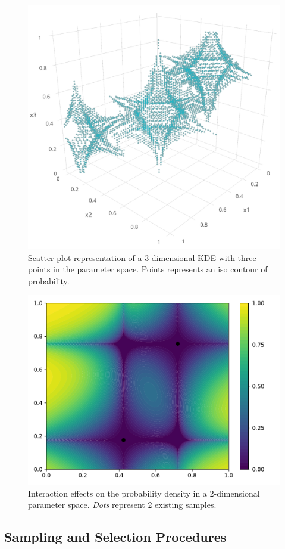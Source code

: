 \begin{figure}[!ht]
\centering
\includegraphics[width=0.7\linewidth,keepaspectratio]{fig/contributions/doe/3d_star.png}
\caption{Scatter plot representation of a 3-dimensional KDE with three points in the parameter space. Points represents an iso contour of probability.}
\label{fig:3d_kde}
\end{figure}


\begin{figure}[!ht]
\centering
\includegraphics[width=0.8\linewidth,keepaspectratio]{fig/contributions/doe/kde_inter.pdf}
\caption{Interaction effects on the probability density in a 2-dimensional parameter space. \emph{Dots} represent 2 existing samples.}
\label{fig:inter_kde}
\end{figure}


\subsection{Sampling and Selection Procedures}\label{sec:sample}

